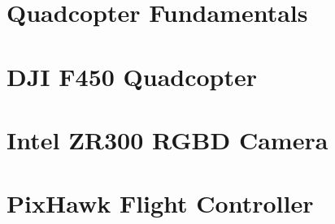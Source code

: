 \section{Quadcopter Fundamentals}
\section{DJI F450 Quadcopter}
\section{Intel ZR300 RGBD Camera}
\section{PixHawk Flight Controller}